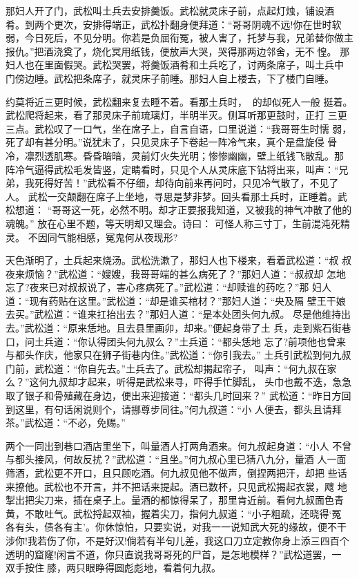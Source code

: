 那妇人开了门，武松叫土兵去安排羹饭。武松就灵床子前，点起灯烛，铺设酒
肴。到两个更次，安排得端正，武松扑翻身便拜道：“哥哥阴魂不远!你在世时软
弱，今日死后，不见分明。你若是负屈衔冤，被人害了，托梦与我，兄弟替你做主
报仇。”把酒浇奠了，烧化冥用纸钱，便放声大哭，哭得那两边邻舍，无不惶。
那妇人也在里面假哭。武松哭罢，将羹饭酒肴和土兵吃了，讨两条席子，叫土兵中
门傍边睡。武松把条席子，就灵床子前睡。那妇人自上楼去，下了楼门自睡。

约莫将近三更时候，武松翻来复去睡不着。看那土兵时，的却似死人一般
挺着。武松爬将起来，看了那灵床子前琉璃灯，半明半灭。侧耳听那更鼓时，正打
三更三点。武松叹了一口气，坐在席子上，自言自语，口里说道：“我哥哥生时懦
弱，死了却有甚分明。”说犹未了，只见灵床子下卷起一阵冷气来，真个是盘旋侵
骨冷，凛烈透肌寒。昏昏暗暗，灵前灯火失光明；惨惨幽幽，壁上纸钱飞散乱。那
阵冷气逼得武松毛发皆竖，定睛看时，只见个人从灵床底下钻将出来，叫声：“兄
弟，我死得好苦！”武松看不仔细，却待向前来再问时，只见冷气散了，不见了人。
武松一交颠翻在席子上坐地，寻思是梦非梦。回头看那土兵时，正睡着。武松想道：
“哥哥这一死，必然不明。却才正要报我知道，又被我的神气冲散了他的魂魄。”
放在心里不题，等天明却又理会。诗曰：
可怪人称三寸丁，生前混沌死精灵。
不因同气能相感，冤鬼何从夜现形?

天色渐明了，土兵起来烧汤。武松洗漱了，那妇人也下楼来，看着武松道：“叔
叔夜来烦恼？”武松道：“嫂嫂，我哥哥端的甚么病死了？”那妇人道：“叔叔却
怎地忘了?夜来已对叔叔说了，害心疼病死了。”武松道：“却赎谁的药吃？”那
妇人道：“现有药贴在这里。”武松道：“却是谁买棺材？”那妇人道：“央及隔
壁王干娘去买。”武松道：“谁来扛抬出去？”那妇人道：“是本处团头何九叔。
尽是他维持出去。”武松道：“原来恁地。且去县里画卯，却来。”便起身带了土
兵，走到紫石街巷口，问土兵道：“你认得团头何九叔么？”土兵道：“都头恁地
忘了?前项他也曾来与都头作庆，他家只在狮子街巷内住。”武松道：“你引我去。”
土兵引武松到何九叔门前，武松道：“你自先去。”土兵去了。武松却揭起帘子，
叫声：“何九叔在家么？”这何九叔却才起来，听得是武松来寻，吓得手忙脚乱，
头巾也戴不迭，急急取了银子和骨殖藏在身边，便出来迎接道：“都头几时回来？”
武松道：“昨日方回到这里，有句话闲说则个，请挪尊步同往。”何九叔道：“小
人便去，都头且请拜茶。”武松道：“不必，免赐。”

两个一同出到巷口酒店里坐下，叫量酒人打两角酒来。何九叔起身道：“小人
不曾与都头接风，何故反扰？”武松道：“且坐。”何九叔心里已猜八九分，量酒
人一面筛酒，武松更不开口，且只顾吃酒。何九叔见他不做声，倒捏两把汗，却把
些话来撩他。武松也不开言，并不把话来提起。酒已数杯，只见武松揭起衣裳，飕
地掣出把尖刀来，插在桌子上。量酒的都惊得呆了，那里肯近前。看何九叔面色青
黄，不敢吐气。武松捋起双袖，握着尖刀，指何九叔道：“小子粗疏，还晓得‘冤
各有头，债各有主’。你休惊怕，只要实说，对我一一说知武大死的缘故，便不干
涉你!我若伤了你，不是好汉!倘若有半句儿差，我这口刀立定教你身上添三四百个
透明的窟窿!闲言不道，你只直说我哥哥死的尸首，是怎地模样？”武松道罢，一
双手按住膝，两只眼睁得圆彪彪地，看着何九叔。

